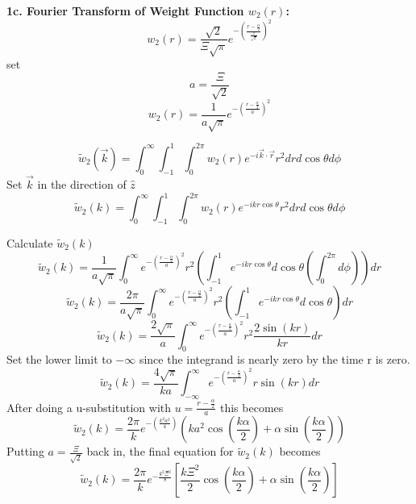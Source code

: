 \documentclass[12pt]{article}
\begin{document}
\[{}\]
\textbf{1c. Fourier Transform of Weight Function $w_{2}(r)$:}
\begin{equation}{w_2(r)=\frac{\sqrt{2}}{\Xi\sqrt{\pi}}e^{-\left(\frac{r-\frac{\alpha}{2}}{\frac{\Xi}{\sqrt{2}}}\right)^2}}\end{equation}
set 
\begin{equation}{a=\frac{\Xi}{\sqrt{2}}}\end{equation}
\begin{equation}{w_2(r)=\frac{1}{a\sqrt{\pi}}e^{-\left(\frac{r-\frac{\alpha}{2}}{a}\right)^2}}\end{equation}

\begin{equation}{\widetilde{w}_2(\vec{k})=\int_{0}^{\infty}\int_{-1}^{1}\int_{0}^{2\pi}w_2(r)e^{-i\vec{k}\cdot{\vec{r}}}r^2d{r}d{\cos\theta}d{\phi}}\end{equation}
Set $\vec{k}$ in the direction of $\hat{z}$ 
\begin{equation}{\widetilde{w}_2(k)=\int_{0}^{\infty}\int_{-1}^{1}\int_{0}^{2\pi}w_2(r)e^{-ikr\cos\theta}r^2d{r}d{\cos\theta}d{\phi}}\end{equation}

\noindent Calculate $\widetilde{w}_2(k)$ 
\begin{equation}{\widetilde{w}_2(k)=\frac{1}{a\sqrt{\pi}}\int_{0}^{\infty}e^{-\left(\frac{r-\frac{\alpha}{2}}{a}\right)^2}r^2\left(\int_{-1}^{1}e^{-ikr\cos\theta}d{\cos\theta}\left(\int_{0}^{2\pi}d{\phi}\right)\right)d{r}}\end{equation}
\[{}\]
\begin{equation}{\widetilde{w}_2(k)=\frac{2\pi}{a\sqrt{\pi}}\int_{0}^{\infty}e^{-\left(\frac{r-\frac{\alpha}{2}}{a}\right)^2}r^2\left(\int_{-1}^{1}e^{-ikr\cos\theta}d{\cos\theta}\right)d{r}}\end{equation}
\begin{equation}{\widetilde{w}_2(k)=\frac{2\sqrt{\pi}}{a}\int_{0}^{\infty}e^{-\left(\frac{r-\frac{\alpha}{2}}{a}\right)^2}r^2\frac{2\sin(kr)}{kr}d{r}}\end{equation}
Set the lower limit to $-\infty$  since the integrand is nearly zero by the time r is zero.
\begin{equation}{\widetilde{w}_2(k)=\frac{4\sqrt{\pi}}{ka}\int_{-\infty}^{\infty}e^{-\left(\frac{r-\frac{\alpha}{2}}{a}\right)^2}r\sin(kr)d{r}}\end{equation}
After doing a u-substitution with $u=\frac{r-\frac{\alpha}{2}}{a}$ this becomes
\begin{equation}{\widetilde{w}_2(k)=\frac{2\pi}{k}e^{-\left(\frac{k^2a^2}{4}\right)}\left(ka^2\cos\left(\frac{k\alpha}{2}\right)+\alpha\sin\left(\frac{k\alpha}{2}\right)\right)}\end{equation}
Putting $a=\frac{\Xi}{\sqrt{2}}$ back in, the final equation for $\widetilde{w}_2(k)$ becomes
\begin{equation}{\widetilde{w}_2(k)=\frac{2\pi}{k}e^{-\frac{k^2\Xi^2}{8}}\left[\frac{k\Xi^2}{2}\cos\left(\frac{k\alpha}{2}\right)+\alpha\sin\left(\frac{k\alpha}{2}\right)\right]}\end{equation}
\end{document}
